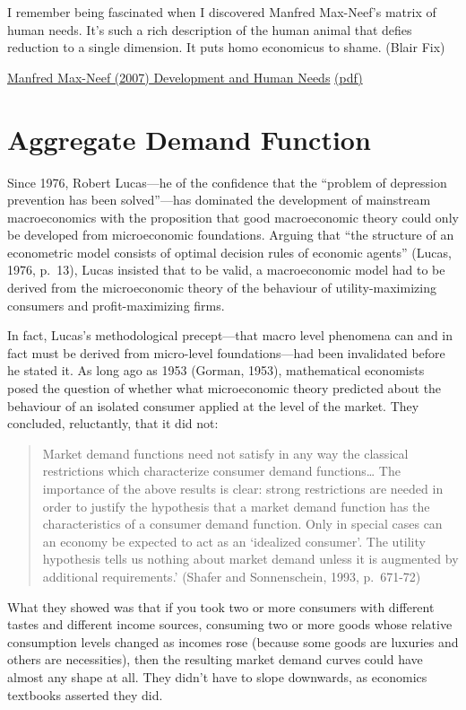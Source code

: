 \documentclass[
]{book}
\begin{document}
I remember being fascinated when I discovered Manfred Max-Neef's matrix of human needs. It's such a rich description of the human animal that defies reduction to a single dimension. It puts homo economicus to shame. (Blair Fix)

\href{https://t.co/OIXQbLvM0z?amp=1}{Manfred Max-Neef (2007) Development and Human Needs}
\href{pdf/Manfred_Max-Neef_2007_Fundamental_Human_Needs.pdf}{(pdf)}

\hypertarget{aggregate-demand-function}{%
\section{Aggregate Demand Function}\label{aggregate-demand-function}}

Since 1976, Robert Lucas---he of the confidence that the ``problem of depression prevention has been solved''---has dominated the development of mainstream macroeconomics with the proposition that good macroeconomic theory could only be developed from microeconomic foundations. Arguing that ``the structure of an econometric model consists of optimal decision rules of economic agents'' (Lucas, 1976, p.~13), Lucas insisted that to be valid, a macroeconomic model had to be derived from the microeconomic theory of the behaviour of utility-maximizing consumers and profit-maximizing firms.

In fact, Lucas's methodological precept---that macro level phenomena can and in fact must be derived from micro-level foundations---had been invalidated before he stated it. As long ago as 1953 (Gorman, 1953), mathematical economists posed the question of whether what microeconomic theory predicted about the behaviour of an isolated consumer applied at the level of the market. They concluded, reluctantly, that it did not:

\begin{quote}
Market demand functions need not satisfy in any way the classical restrictions which characterize consumer demand functions\ldots{} The importance of the above results is clear: strong restrictions are needed in order to justify the hypothesis that a market demand function has the characteristics of a consumer demand function. Only in special cases can an economy be expected to act as an `idealized consumer'. The utility hypothesis tells us nothing about market demand unless it is augmented by additional requirements.' (Shafer and Sonnenschein, 1993, p.~671-72)
\end{quote}

What they showed was that if you took two or more consumers with different tastes and different income sources, consuming two or more goods whose relative consumption levels changed as incomes rose (because some goods are luxuries and others are necessities), then the resulting market demand curves could have almost any shape at all. They didn't have to slope downwards, as economics textbooks asserted they did.
\end{document}
